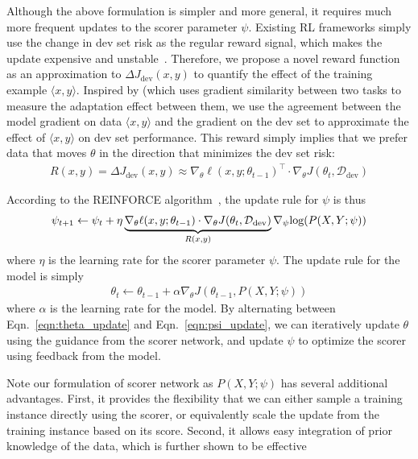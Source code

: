Although the above formulation is simpler and more general, it requires much more frequent updates to the scorer parameter $\psi$. Existing RL frameworks simply use the change in dev set risk as the regular reward signal, which makes the update expensive and unstable~\citep{learn_to_teach,rl_nmt}. Therefore, we propose a novel reward function as an approximation to $\Delta J_{\text{dev}}(x, y)$ to quantify the effect of the training example $\langle x, y \rangle$. Inspired by \citet{cos_sim} (which uses gradient similarity between two tasks to measure the adaptation effect between them, we use the agreement between the model gradient on data $\langle x, y \rangle$ and the gradient on the dev set to approximate the effect of $\langle x, y \rangle$ on dev set performance. This reward simply implies that we prefer data that moves $\theta$ in the direction that minimizes the dev set risk: 
\begin{align}
    \label{eqn:reward_fn}
    R(x, y) = \Delta J_{\text{dev}}(x, y) \approx \nabla_\theta \ell(x, y; \theta_{t-1})^\top \cdot \nabla_\theta J(\theta_t, \mathcal{D}_\text{dev}) 
\end{align}

According to the REINFORCE algorithm~\citep{reinforce}, the update rule for $\psi$ is thus
\begin{align}
    \label{eqn:psi_update}
    \psi_{t+1} \leftarrow  \psi_t + \eta \underbrace{\nabla_\theta \ell(x, y; \theta_{t-1}) \cdot \nabla_\theta J(\theta_t, \mathcal{D}_\text{dev})}_{\mathclap{R(x, y)}} \nabla_\psi \text{log}(P(X, Y;\psi))
\end{align}
where $\eta$ is the learning rate for the scorer parameter $\psi$. The update rule for the model is simply
\begin{align}
    \label{eqn:theta_update}
    \theta_t \leftarrow \theta_{t-1} + \alpha \nabla_\theta J(\theta_{t-1}, P(X, Y;\psi))
\end{align}
where $\alpha$ is the learning rate for the model. By alternating between Eqn.~\ref{eqn:theta_update} and Eqn.~\ref{eqn:psi_update}, we can iteratively update $\theta$ using the guidance from the scorer network, and update $\psi$ to optimize the scorer using feedback from the model.  

Note our formulation of scorer network as $P(X, Y; \psi)$ has several additional advantages. First, it provides the flexibility that we can either sample a training instance directly using the scorer, or equivalently scale the update from the training instance based on its score. Second, it allows easy integration of prior knowledge of the data, which is further shown to be effective 

